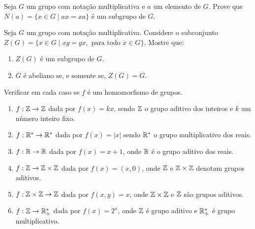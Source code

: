 \documentclass[12pt]{article}
\begin{document}


\vesp

\questao Seja $G$ um grupo com nota\c{c}\~ao multiplicativa e $a$ um elemento de $G$. Prove que $N(a) = \{x \in G \mid ax = xa\}$ \'e um subgrupo de $G$.

\vesp

\questao Seja $G$ um grupo com nota\c{c}\~ao multiplicativa. Considere o subconjunto $Z(G) = \{x \in G \mid xg = gx, \mbox{ para todo } x \in G\}$. Mostre que:
\begin{enumerate}[label=({\alph*})]
	\item $Z(G)$ \'e um subgrupo de $G$.
	\item $G$ \'e abeliano se, e somente se, $Z(G) = G$.
\end{enumerate}

\vesp

\questao Verificar em cada caso se $f$ \'e um homomorfismo de grupos.
\begin{enumerate}[label=({\alph*})]
	\item $f: \mathbb{Z} \to \mathbb{Z}$ dada por $f(x) = kx$, sendo $\mathbb{Z}$ o grupo aditivo dos inteiros e $k$ um n\'umero inteiro fixo.
	\item $f: \mathbb{R}^* \to \mathbb{R}^*$ dada por $f(x) = |x|$ sendo $\mathbb{R}^*$ o grupo multiplicativo dos reais.
	\item $f: \mathbb{R} \to \mathbb{R}$ dada por $f(x) = x + 1$, onde $\mathbb{R}$ \'e o grupo aditivo dos reais.
	\item $f: \mathbb{Z} \to \mathbb{Z} \times \mathbb{Z}$ dada por $f(x) = (x, 0)$, onde $\mathbb{Z}$ e $\mathbb{Z} \times \mathbb{Z}$ denotam grupos aditivos.
	\item $f: \mathbb{Z} \times \mathbb{Z} \to \mathbb{Z}$ dada por $f(x,y) = x$, onde $\mathbb{Z} \times \mathbb{Z}$ e $\mathbb{Z}$ s\~ao grupos aditivos.
	\item $f: \mathbb{Z} \to \mathbb{R}^*_+$ dada por $f(x) = 2^x$, onde $\mathbb{Z}$ \'e grupo aditivo e $\mathbb{R}^*_+$ \'e grupo multiplicativo.
\end{enumerate}
\end{document}
